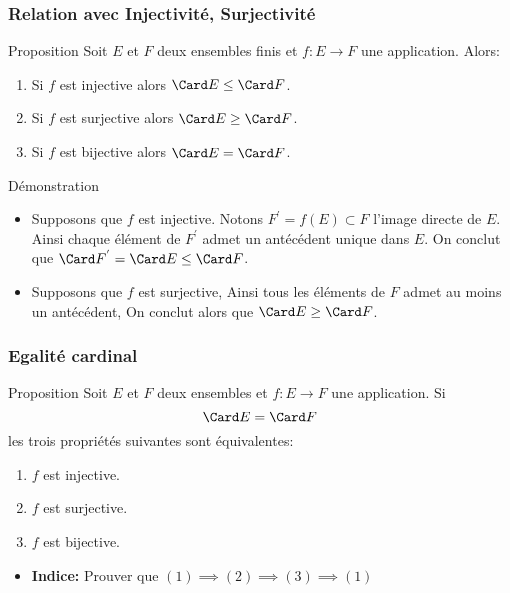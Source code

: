 \begin{frame}[t]
  \frametitle{Relation avec Injectivité, Surjectivité}
 \begin{block}{Proposition}
   Soit $E$ et $F$ deux ensembles finis et $f:E\rightarrow F$ une application.
   Alors:

   \begin{enumerate}
     \item Si $f$ est \alert{injective} alors $\Card E \leq \Card F$.\\[8pt]
     \item Si $f$ est \alert{surjective} alors $\Card E \geq \Card F$.\\[8pt]
     \item Si $f$ est \alert{bijective} alors $\Card E = \Card F$.\\[8pt]
   \end{enumerate}
 \end{block} 
 \pause
 \begin{block}{Démonstration}
   \begin{itemize}
     \scriptsize
     \item Supposons que $f$ est injective. Notons $F^{'}=f(E)\subset F$ l'image directe
       de $E$. Ainsi  chaque élément de $F^{'}$ admet un antécédent unique
       dans $E$. On conclut que $\Card F^{'} = \Card E \leq \Card F$.
     \item Supposons que $f$ est surjective, Ainsi tous les éléments de $F$
       admet au moins un antécédent, On conclut alors que $\Card E \geq \Card
       F$.
   \end{itemize} 
 \end{block}
\end{frame}

\begin{frame}[t]
  \frametitle{ Egalité cardinal}
 \begin{block}{Proposition}
  Soit $E$ et $F$ deux ensembles et $f:E\rightarrow F$ une application. Si 
  \begin{equation}
    \Card E = \Card F
  \end{equation}
  les trois propriétés suivantes sont équivalentes:
  \begin{enumerate}
    \item $f$ est injective.\\[8pt]
    \item $f$ est surjective.\\[8pt]
    \item $f$ est bijective.\\[8pt]
  \end{enumerate}
 \end{block} 
 \begin{itemize}
   \item \alert{\textbf{Indice:}} Prouver que $(1)\implies (2)\implies
     (3)\implies (1) $
 \end{itemize}
\end{frame}

